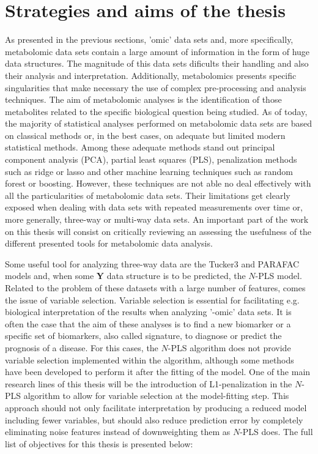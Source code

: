 \section{Strategies and aims of the thesis}
\label{sec:strategiesthesis}
As presented in the previous sections, 'omic' data sets and, more specifically, metabolomic data sets contain a large amount of information in the form of huge data structures. The magnitude of this data sets dificults their handling and also their analysis and interpretation. Additionally, metabolomics presents specific singularities that make necessary the use of complex pre-processing and analysis techniques. The aim of metabolomic analyses is the identification of those metabolites related to the specific biological question being studied. As of today, the majority of statistical analyses performed on metabolomic data sets are based on classical methods or, in the best cases, on adequate but limited modern statistical methods. Among these adequate methods stand out principal component analysis (PCA), partial least squares (PLS), penalization methods such as ridge or lasso and other machine learning techniques such as random forest or boosting. However, these techniques are not able no deal effectively with all the particularities of metabolomic data sets. Their limitations get clearly exposed when dealing with data sets with repeated measurements over time or, more generally, three-way or multi-way data sets. An important part of the work on this thesis will consist on critically reviewing an assessing the usefulness of the different presented tools for metabolomic data analysis.

Some useful tool for analyzing three-way data are the Tucker3 and PARAFAC models and, when some \textbf{Y} data structure is to be predicted, the $N$-PLS model. Related to the problem of these datasets with a large number of features, comes the issue of variable selection. Variable selection is essential for facilitating e.g. biological interpretation of the results when analyzing '-omic' data sets. It is often the case that the aim of these analyses is to find a new biomarker or a specific set of biomarkers, also called signature, to diagnose or predict the prognosis of a disease. For this cases, the $N$-PLS algorithm does not provide variable selection implemented within the algorithm, although some methods have been developed to perform it after the fitting of the model. One of the main research lines of this thesis will be the introduction of L1-penalization in the $N$-PLS algorithm to allow for variable selection at the model-fitting step. This approach should not only facilitate interpretation by producing a reduced model including fewer variables, but should also reduce prediction error by completely eliminating noise features instead of downweighting them as $N$-PLS does. 
The full list of objectives for this thesis is presented below:

